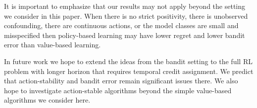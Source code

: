 It is important to emphasize that our results may not apply beyond the setting we consider in this paper. When there is no strict positivity, there is unobserved confounding, there are continuous actions, or the model classes are small and misspecified then policy-based learning may have lower regret and lower bandit error than value-based learning.

In future work we hope to extend the ideas from the bandit setting to the full RL problem with longer horizon that requires temporal credit assignment. We predict that action-stability and bandit error remain significant issues there.
We also hope to investigate action-stable algorithms beyond the simple value-based algorithms we consider here.






